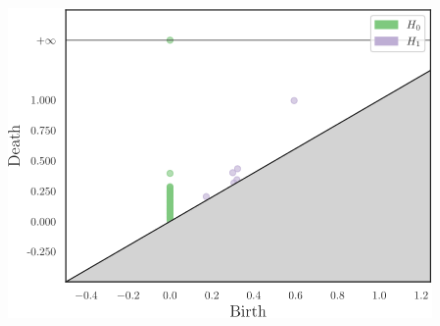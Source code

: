 \documentclass[10pt]{beamer}
\begin{document}
\begin{frame}[fragile]{}

  \begin{figure}[ht]
    \centering
    \includegraphics[scale=0.7]{diagram.pdf}
  \end{figure}
\end{frame}
\end{document}

